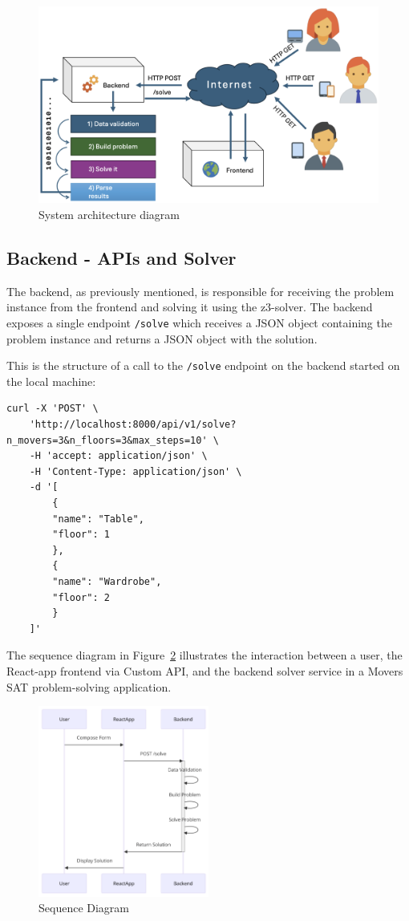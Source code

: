 \documentclass[a4paper, 11pt]{article}
\begin{document}
\begin{figure}[H]
	\centering
	\includegraphics[width=\textwidth]{./images/System_Design.png}
	\caption{System architecture diagram}
	\label{fig:ui_diagram}
\end{figure}

\subsection{Backend - APIs and Solver}
The backend, as previously mentioned, is responsible for receiving the problem instance from the frontend and solving it using the z3-solver. The backend exposes a single endpoint \texttt{/solve} which receives a JSON object containing the problem instance and returns a JSON object with the solution.

This is the structure of a call to the \texttt{/solve} endpoint on the backend started on the local machine:

\begin{verbatim}
curl -X 'POST' \
	'http://localhost:8000/api/v1/solve?n_movers=3&n_floors=3&max_steps=10' \
	-H 'accept: application/json' \
	-H 'Content-Type: application/json' \
	-d '[
		{
		"name": "Table",
		"floor": 1
		},
		{
		"name": "Wardrobe",
		"floor": 2
		}
	]'
\end{verbatim}

The sequence diagram in Figure~\ref{fig:sequence-diagram} illustrates the interaction between a user, the React-app frontend via Custom API, and the backend solver service in a Movers SAT problem-solving application.

\begin{figure}[H]
	\centering
	\includegraphics[width=0.5\textwidth]{./images/sequenceDiagram.png}
	\caption{Sequence Diagram}
	\label{fig:sequence-diagram}
\end{figure}
\end{document}
